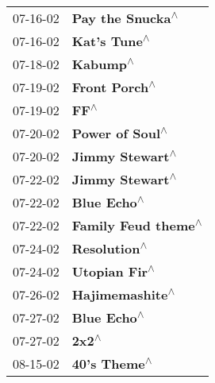 \begin{supertabular}{p{0.25\columnwidth}p{0.75\columnwidth}}
 07-16-02 &                                                           \textbf{Pay the Snucka\textsuperscript{$\wedge$}} \\
 07-16-02 &                                                               \textbf{Kat's Tune\textsuperscript{$\wedge$}} \\
 07-18-02 &                                                                   \textbf{Kabump\textsuperscript{$\wedge$}} \\
 07-19-02 &                                                              \textbf{Front Porch\textsuperscript{$\wedge$}} \\
 07-19-02 &                                                                       \textbf{FF\textsuperscript{$\wedge$}} \\
 07-20-02 &                                                            \textbf{Power of Soul\textsuperscript{$\wedge$}} \\
 07-20-02 &                                                            \textbf{Jimmy Stewart\textsuperscript{$\wedge$}} \\
 07-22-02 &                                                            \textbf{Jimmy Stewart\textsuperscript{$\wedge$}} \\
 07-22-02 &                                                                \textbf{Blue Echo\textsuperscript{$\wedge$}} \\
 07-22-02 &                                                        \textbf{Family Feud theme\textsuperscript{$\wedge$}} \\
 07-24-02 &                                                               \textbf{Resolution\textsuperscript{$\wedge$}} \\
 07-24-02 &                                                              \textbf{Utopian Fir\textsuperscript{$\wedge$}} \\
 07-26-02 &                                                            \textbf{Hajimemashite\textsuperscript{$\wedge$}} \\
 07-27-02 &                                                                \textbf{Blue Echo\textsuperscript{$\wedge$}} \\
 07-27-02 &                                                                      \textbf{2x2\textsuperscript{$\wedge$}} \\
 08-15-02 &                                                               \textbf{40's Theme\textsuperscript{$\wedge$}} \\

\end{supertabular}
